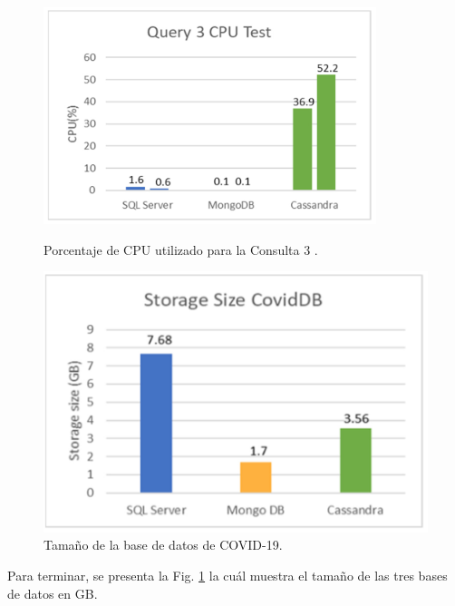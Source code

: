 \documentclass[pdflatex,sn-mathphys-num]{sn-jnl}
\theoremstyle{thmstyleone}%
\theoremstyle{thmstyletwo}%
\theoremstyle{thmstylethree}%
\begin{document}
\begin{figure}[H]
    \centering
    \begin{minipage}[b]{0.48\textwidth}
        \centering
        \includegraphics[width=\textwidth]{figs/cov19-cpu-test-q3.png}
        \caption{Porcentaje de CPU utilizado para la Consulta 3 .}
        \label{cov19-cputest-q3}
    \end{minipage}
    \hfill
    \begin{minipage}[b]{0.48\textwidth}
        \centering
        \includegraphics[width=\textwidth]{figs/cov19-storage.png}
        \caption{Tamaño de la base de datos de COVID-19.}
        \label{cov19-storage}
    \end{minipage}
\end{figure}

\vspace{-0.5cm}

Para terminar, se presenta la Fig. \ref{cov19-storage} la cuál muestra el tamaño de las tres bases de datos en GB.
\end{document}
